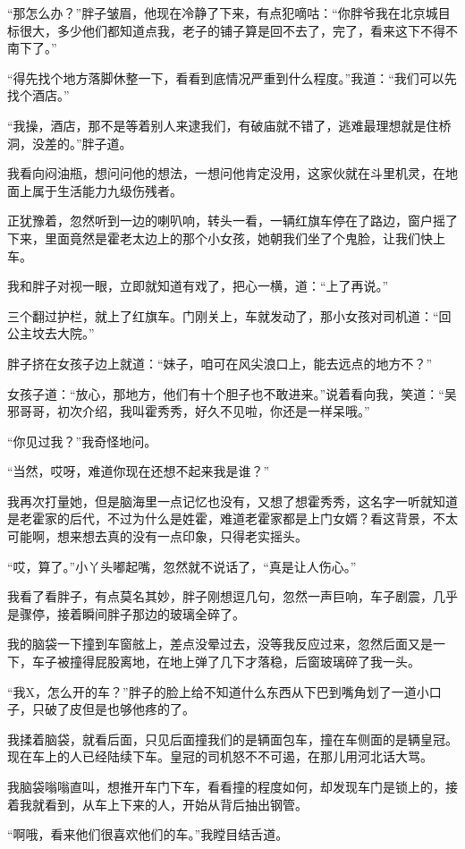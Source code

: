 “那怎么办？”胖子皱眉，他现在冷静了下来，有点犯嘀咕：“你胖爷我在北京城目标很大，多少他们都知道点我，老子的铺子算是回不去了，完了，看来这下不得不南下了。”

“得先找个地方落脚休整一下，看看到底情况严重到什么程度。”我道：“我们可以先找个酒店。”

“我操，酒店，那不是等着别人来逮我们，有破庙就不错了，逃难最理想就是住桥洞，没差的。”胖子道。

我看向闷油瓶，想问问他的想法，一想问他肯定没用，这家伙就在斗里机灵，在地面上属于生活能力九级伤残者。

正犹豫着，忽然听到一边的喇叭响，转头一看，一辆红旗车停在了路边，窗户摇了下来，里面竟然是霍老太边上的那个小女孩，她朝我们坐了个鬼脸，让我们快上车。

我和胖子对视一眼，立即就知道有戏了，把心一横，道：“上了再说。”

三个翻过护栏，就上了红旗车。门刚关上，车就发动了，那小女孩对司机道：“回公主坟去大院。”

胖子挤在女孩子边上就道：“妹子，咱可在风尖浪口上，能去远点的地方不？”

女孩子道：“放心，那地方，他们有十个胆子也不敢进来。”说着看向我，笑道：“吴邪哥哥，初次介绍，我叫霍秀秀，好久不见啦，你还是一样呆哦。”

“你见过我？”我奇怪地问。

“当然，哎呀，难道你现在还想不起来我是谁？”

我再次打量她，但是脑海里一点记忆也没有，又想了想霍秀秀，这名字一听就知道是老霍家的后代，不过为什么是姓霍，难道老霍家都是上门女婿？看这背景，不太可能啊，想来想去真的没有一点印象，只得老实摇头。

“哎，算了。”小丫头嘟起嘴，忽然就不说话了，“真是让人伤心。”

我看了看胖子，有点莫名其妙，胖子刚想逗几句，忽然一声巨响，车子剧震，几乎是骤停，接着瞬间胖子那边的玻璃全碎了。

我的脑袋一下撞到车窗舷上，差点没晕过去，没等我反应过来，忽然后面又是一下，车子被撞得屁股离地，在地上弹了几下才落稳，后窗玻璃碎了我一头。

“我X，怎么开的车？”胖子的脸上给不知道什么东西从下巴到嘴角划了一道小口子，只破了皮但是也够他疼的了。

我揉着脑袋，就看后面，只见后面撞我们的是辆面包车，撞在车侧面的是辆皇冠。现在车上的人已经陆续下车。皇冠的司机怒不不可遏，在那儿用河北话大骂。

我脑袋嗡嗡直叫，想推开车门下车，看看撞的程度如何，却发现车门是锁上的，接着我就看到，从车上下来的人，开始从背后抽出钢管。

“啊哦，看来他们很喜欢他们的车。”我瞠目结舌道。

